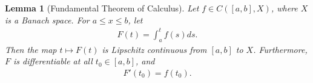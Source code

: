 \documentclass[12pt,reqno]{amsart}
\numberwithin{equation}{section}  %
\numberwithin{figure}{section}
\theoremstyle{plain}
\newtheorem{lemma}{Lemma}
\theoremstyle{definition}
\theoremstyle{remark}
\begin{document}
%
%
%
%
%
%
%
%
\begin{lemma}[Fundamental Theorem of Calculus]
Let $f \in C\left( [a,b], X \right)$, where $X$ is a Banach space. For $a \le x
\le b$, let
%
%
\begin{equation*}
\begin{split}
  F(t) = \int_{a}^{t}f(s)ds.
\end{split}
\end{equation*}
%
%
Then the map $t \mapsto F(t)$ is Lipschitz continuous from $[a,b]$ to $X$.
Furthermore, $F$ is differentiable at all $t_{0} \in [a,b]$, and
%
%
\begin{equation}
  \label{fund-thm-calc-diff}
\begin{split}
  F'(t_{0})= f(t_{0}).
\end{split}
\end{equation}
\label{lem:fund-thm-calc}
\end{lemma}
%
%
%
%
\end{document}
